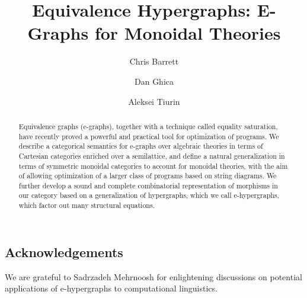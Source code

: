 \documentclass
  [ acmsmall
  , pdftex
  , dvipsnames
  , review
  , nonacm
  , screen
  ]{acmart}
\title{Equivalence Hypergraphs: E-Graphs for Monoidal Theories }
\author{Chris Barrett}
\author{Dan Ghica}
\author{Aleksei Tiurin}
\begin{document}
\begin{abstract}
Equivalence graphs (e-graphs), together with a technique called equality saturation, have recently proved a powerful and practical tool for optimization of programs.  We describe a categorical semantics for e-graphs over algebraic theories in terms of Cartesian categories enriched over a semilattice,  and define a natural generalization in terms of symmetric monoidal categories to account for monoidal theories,  with the aim of allowing optimization of a larger class of programs based on string diagrams.  We further develop a sound and complete combinatorial representation of morphisms in our category based on a generalization of hypergraphs,  which we call e-hypergraphs,  which factor out many structural equations. 
\end{abstract}

\maketitle








\subsection*{Acknowledgements}
We are grateful to Sadrzadeh Mehrnoosh for enlightening discussions on potential applications of e-hypergraphs to computational linguistics. 



\end{document}

